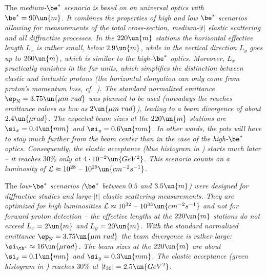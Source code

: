 \> The \em{medium-$\be^*$} scenario is based on an universal optics with $\be^* = 90\un{m}$. It combines the properties of high and low $\be^*$ scenarios allowing for measurements of the total cross-section, medium-$|t|$ elastic scattering and all diffractive processes. In the $220\un{m}$ stations the horizontal effective length $L_x$ is rather small, below $2.9\un{m}$, while in the vertical direction $L_y$ goes up to $260\un{m}$, which is similar to the high-$\be^*$ optics. Moreover, $L_x$ practically vanishes in the far units, which simplifies the distinction between elastic and inelastic protons (the horizontal elongation can only come from proton's momentum loss, cf.~). The standard normalized emittance $\ep_{\rm N} = 3.75\un{\mu m\ rad}$ was planned to be used (nowadays the  reaches emittance values as low as $2\un{\mu m\ rad}$), leading to a beam divergence of about $2.4\un{\mu rad}$. The expected beam sizes at the $220\un{m}$ stations are $\si_x = 0.4\un{mm}$ and $\si_y = 0.6\un{mm}$. In other words, the pots will have to stay much further from the beam center than in the case of the high-$\be^*$ optics. Consequently, the elastic acceptance (blue histogram in ) starts much later -- it reaches $30\percent$ only at $4\cdot 10^{-2}\un{GeV^2}$. This scenario counts on a luminosity of ${\cal L} \approx 10^{28} \hbox{ -- } 10^{29}\un{cm^{-2}s^{-1}}$.

\> The \em{low-$\be^*$} scenarios ($\be^*$ between $0.5$ and $3.5\un{m}$) were designed for diffractive studies and large-$|t|$ elastic scattering measurements. They are optimized for high luminosities ${\cal L} \approx 10^{32} \hbox{ -- } 10^{33}\un{cm^{-2}s^{-1}}$ and not for forward proton detection -- the effective lengths at the $220\un{m}$ stations do not exceed $L_x = 2\un{m}$ and $L_y = 20\un{m}$. With the standard normalized emittance $\ep_{\rm N} = 3.75\un{\mu m\ rad}$ the beam divergence is rather large: $\si_{\th^*} \approx 16\un{\mu rad}$. The beam sizes at the $220\un{m}$ are about $\si_x = 0.1\un{mm}$ and $\si_y = 0.3\un{mm}$. The elastic acceptance (green histogram in ) reaches $30\percent$ at $|t_{30}| = 2.5\un{GeV^2}$.


